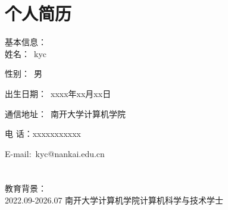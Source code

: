 
\chapter*{个人简历}

\noindent 基本信息：\\

 姓名：~kyc

 性别：~男

 出生日期：~xxxx年xx月xx日

 通信地址：~南开大学计算机学院

 电  话：xxxxxxxxxxx

 E-mail:~kyc@nankai.edu.cn \\ \\
\\
教育背景：\\

2022.09-2026.07 \quad 南开大学\quad 计算机学院\quad\quad 计算机科学与技术\quad\quad 学士 \\
